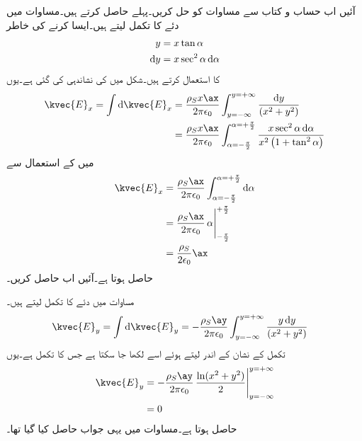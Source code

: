 آئیں اب حساب و کتاب سے مساوات  کو حل کریں۔پہلے  حاصل کرتے ہیں۔مساوات  میں دئے  کا تکمل لیتے ہیں۔ایسا کرنے کی خاطر
\begin{gather}
\begin{aligned}\label{مساوات_کولومب_ٹینجنٹ_کی_مدد_سے_تکملہ_کا_حصول}
y&=x \tan \alpha\\
\dif y &=x \sec^2 \alpha \dif \alpha
\end{aligned}
\end{gather}
کا استعمال کرتے ہیں۔شکل  میں  کی نشاندہی کی گئی ہے۔یوں
\begin{align*}
\kvec{E}_x=\int \dif \kvec{E}_x &=\frac{\rho_S x \ax}{2\pi \epsilon_0}\int_{y=-\infty}^{y=+\infty}\frac{\dif y }{ \left(x^2+y^2\right)}\\
&=\frac{\rho_S x \ax}{2\pi \epsilon_0}\int_{\alpha=-\frac{\pi}{2}}^{\alpha=+\frac{\pi}{2}} \frac{x \sec^2 \alpha \dif \alpha}{x^2\left(1+ \tan^2 \alpha\right)}
\end{align*}
میں  کے استعمال سے
\begin{gather}
\begin{aligned}\label{مساوات_کولومب_لامحدود_سطح_عمودی_جزو}
\kvec{E}_x&=\frac{\rho_S\ax}{2\pi \epsilon_0}\int_{\alpha=-\frac{\pi}{2}}^{\alpha=+\frac{\pi}{2}}\dif \alpha\\
&=\frac{\rho_S\ax}{2\pi \epsilon_0} \eval{\alpha}_{-\frac{\pi}{2}}^{+\frac{\pi}{2}}\\
&=\frac{\rho_S}{2 \epsilon_0}\ax
\end{aligned}
\end{gather}
حاصل ہوتا ہے۔آئیں اب  حاصل کریں۔

مساوات  میں دئے  کا تکمل لیتے ہیں۔
\begin{align*}
\kvec{E}_y=\int \dif \kvec{E}_y&=-\frac{\rho_S \ay}{2 \pi \epsilon_0} \int_{y=-\infty}^{y=+\infty}\frac{ y\dif y }{ \left(x^2+y^2\right)}
\end{align*}
تکمل کے نشان کے اندر  لیتے ہوئے  اسے  لکھا جا سکتا ہے جس کا تکمل  ہے۔یوں
\begin{gather}
\begin{aligned}\label{مساوات_کولومب_لامحدود_سطح_افقی_جزو}
\kvec{E}_y&=-\frac{\rho_S \ay}{2 \pi \epsilon_0} \eval{\frac{\ln(x^2+y^2)}{2}}_{y=-\infty}^{y=+\infty}\\
&=0
\end{aligned}
\end{gather}
حاصل ہوتا ہے۔مساوات  میں یہی جواب حاصل کیا گیا تھا۔

